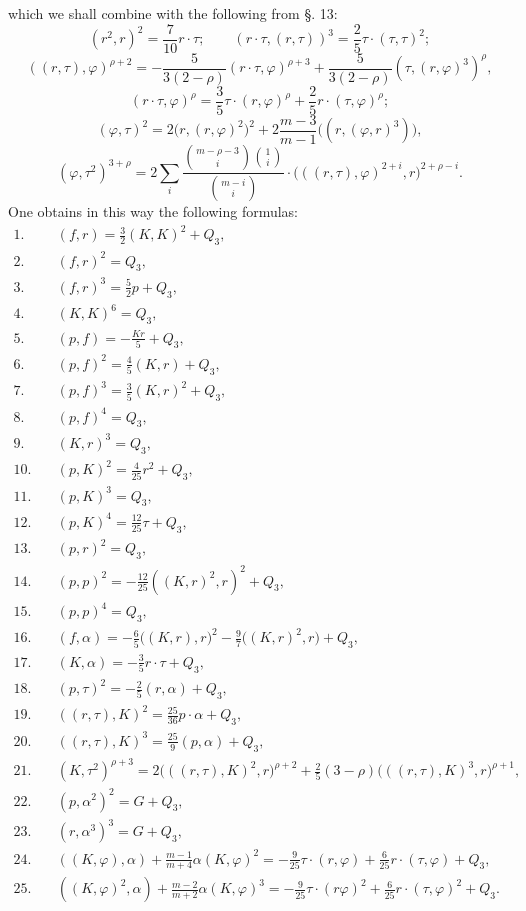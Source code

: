 \documentclass[10pt]{article}
\begin{document}
which we shall combine with the following from §. 13:
\[
(r^2,r)^2=\frac7{10}r\cdot\tau;
\qquad (r\cdot\tau,(r,\tau))^3=\frac25\tau\cdot(\tau,\tau)^2;
\]
\[
((r,\tau),\varphi)^{\rho+2}=-\frac5{3(2-\rho)}(r\cdot\tau,\varphi)^{\rho+3}+\frac5{3(2-\rho)}(\tau,(r,\varphi)^3)^\rho,
\]
\[
(r\cdot\tau,\varphi)^\rho=\frac35\tau\cdot(r,\varphi)^\rho+\frac25r\cdot(\tau,\varphi)^\rho;
\]
\[
(\varphi,\tau)^2=2\bigl(r,(r,\varphi)^2\bigr)^2+2\frac{m-3}{m-1}\bigl((r,(\varphi,r)^3)\bigr),
\]
\[
(\varphi,\tau^2)^{3+\rho}=2\sum_i\frac{\binom{m-\rho-3}{i}\binom{1}{i}}{\binom{m-i}{i}}\cdot\bigl(((r,\tau),\varphi)^{2+i},r\bigr)^{2+\rho-i}.
\]
One obtains in this way the following formulas:
\begin{align*}
1.\quad &(f,r)=\frac32(K,K)^2+Q_3,\\
2.\quad &(f,r)^2=Q_3,\\
3.\quad &(f,r)^3=\frac52p+Q_3,\\
4.\quad &(K,K)^6=Q_3,\\
5.\quad &(p,f)=-\frac{Kr}{5}+Q_3,\\
6.\quad &(p,f)^2=\frac45(K,r)+Q_3,\\
7.\quad &(p,f)^3=\frac35(K,r)^2+Q_3,\\
8.\quad &(p,f)^4=Q_3,\\
9.\quad &(K,r)^3=Q_3,\\
10.\quad &(p,K)^2=\frac4{25}r^2+Q_3,\\
11.\quad &(p,K)^3=Q_3,\\
12.\quad &(p,K)^4=\frac{12}{25}\tau+Q_3,\\
13.\quad &(p,r)^2=Q_3,\\
14.\quad &(p,p)^2=-\frac{12}{25}((K,r)^2,r)^2+Q_3,\\
15.\quad &(p,p)^4=Q_3,\\
16.\quad &(f,\alpha)=-\frac65\bigl((K,r),r\bigr)^2-\frac97\bigl((K,r)^2,r\bigr)+Q_3,\\
17.\quad &(K,\alpha)=-\frac35r\cdot\tau+Q_3,\\
18.\quad &(p,\tau)^2=-\frac25(r,\alpha)+Q_3,\\
19.\quad &((r,\tau),K)^2=\frac{25}{36}p\cdot\alpha+Q_3,\\
20.\quad &((r,\tau),K)^3=\frac{25}{9}(p,\alpha)+Q_3,\\
21.\quad &(K,\tau^2)^{\rho+3}=2\bigl(((r,\tau),K)^2,r\bigr)^{\rho+2}+\frac25(3-\rho)\bigl(((r,\tau),K)^3,r\bigr)^{\rho+1},\\
22.\quad &(p,\alpha^2)^2=G+Q_3,\\
23.\quad &(r,\alpha^3)^3=G+Q_3,\\
24.\quad &((K,\varphi),\alpha)+\frac{m-1}{m+4}\alpha(K,\varphi)^2=-\frac9{25}\tau\cdot(r,\varphi)+\frac6{25}r\cdot(\tau,\varphi)+Q_3,\\
25.\quad &((K,\varphi)^2,\alpha)+\frac{m-2}{m+2}\alpha(K,\varphi)^3=-\frac9{25}\tau\cdot(r\varphi)^2+\frac6{25}r\cdot(\tau,\varphi)^2+Q_3.
\end{align*}
\end{document}

